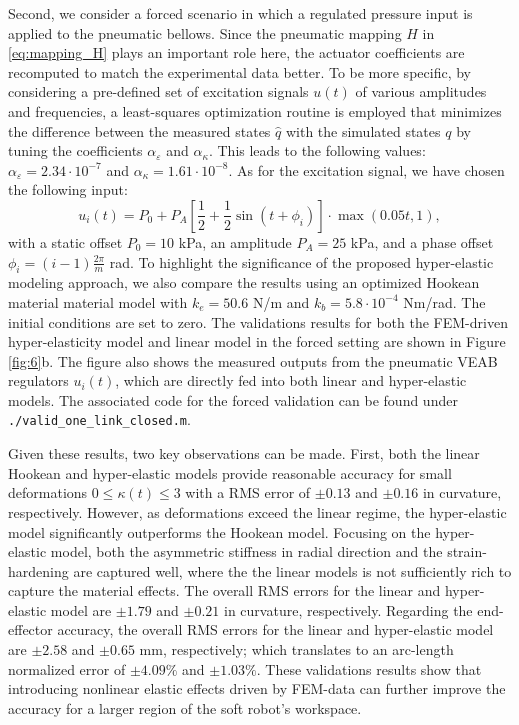Second, we consider a forced scenario in which a regulated pressure input is applied to the pneumatic bellows. Since the pneumatic mapping $H$ in \eqref{eq:mapping_H} plays an important role here, the actuator coefficients are recomputed to match the experimental data better. To be more specific, by considering a pre-defined set of excitation signals $u(t)$ of various amplitudes and frequencies, a least-squares optimization routine is employed that minimizes the difference between the measured states $\hat{q}$ with the simulated states ${q}$ by tuning the coefficients $\alpha_\varepsilon$ and $\alpha_\kappa$. This leads to the following values: $\alpha_\varepsilon = 2.34\cdot 10^{-7}$ and $\alpha_\kappa =  1.61\cdot 10^{-8}$. As for the excitation signal, we have chosen the following input:
%
\begin{equation}
u_i(t) = P_0 + P_A \left[\frac{1}{2} + \frac{1}{2}\sin(t + \phi_i) \right]\cdot \max(0.05t,1),
\end{equation}
%
with a static offset $P_0 = 10$ kPa, an amplitude $P_A = 25$ kPa, and a phase offset $\phi_i = (i-1)\frac{2\pi}{m}$ rad. To highlight the significance of the proposed hyper-elastic modeling approach, we also compare the results using an optimized Hookean material material model with $k_e = 50.6$ N/m and $k_b = 5.8\cdot 10^{-4}$ Nm/rad. The initial conditions are set to zero. The validations results for both the FEM-driven hyper-elasticity model and linear model in the forced setting are shown in Figure \ref{fig:6}b. The figure also shows the measured outputs from the pneumatic VEAB regulators $u_i(t)$, which are directly fed into both linear and hyper-elastic models. The associated code for the forced validation can be found under \texttt{./valid\_one\_link\_closed.m}.

Given these results, two key observations can be made. First, both the linear Hookean and hyper-elastic models provide reasonable accuracy for small deformations $0 \le \kappa(t) \le 3$ with a RMS error of $\pm0.13$ and $\pm0.16$ in curvature, respectively. However, as deformations exceed the linear regime, the hyper-elastic model significantly outperforms the Hookean model. Focusing on the hyper-elastic model, both the asymmetric stiffness in radial direction and the strain-hardening are captured well, where the the linear models is not sufficiently rich to capture the material effects. The overall RMS errors for the linear and hyper-elastic model are $\pm1.79$ and $\pm0.21$ in curvature, respectively. Regarding the end-effector accuracy, the overall RMS errors for the linear and hyper-elastic model are $\pm2.58$ and $\pm0.65$ mm, respectively; which translates to an arc-length normalized error of $\pm4.09\%$ and $\pm1.03\%$. These validations results show that introducing nonlinear elastic effects driven by FEM-data can further improve the accuracy for a larger region of the soft robot's workspace.

